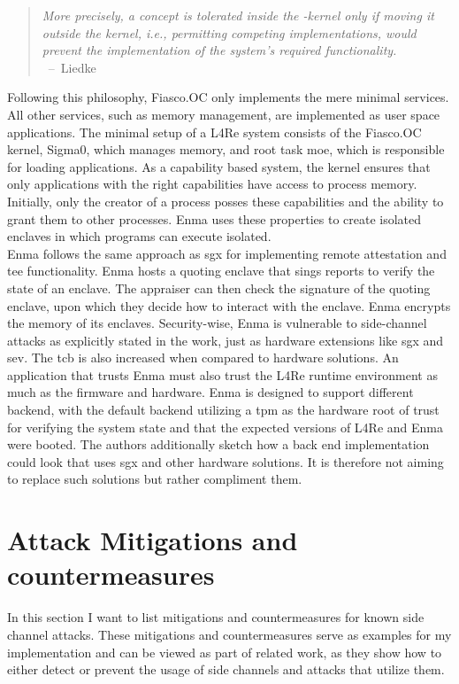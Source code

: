 \begin{quote}
  \textit{ More precisely, a concept is tolerated inside the \mu-kernel only
    if moving it outside the kernel, i.e., permitting competing
    implementations, would prevent the implementation of the system's
    required functionality. \\
  } \mbox{ -- Liedke\cite{liedtke1995micro}}
\end{quote}

Following this philosophy, Fiasco.OC only implements the mere minimal services.
All other services, such as memory management, are implemented as user space
applications. The minimal setup of a L4Re system consists of the Fiasco.OC
kernel, Sigma0, which manages memory, and root task moe, which is responsible
for loading applications. As a capability based system, the kernel ensures that
only applications with the right capabilities have access to process memory.
Initially, only the creator of a process posses these capabilities and the
ability to grant them to other processes. Enma uses these properties to create
isolated enclaves in which programs can execute isolated.\\

Enma follows the same approach as \gls{sgx} for implementing remote attestation
and \gls{tee} functionality. Enma hosts a quoting enclave that sings reports to
verify the state of an enclave. The appraiser can then check the signature of
the quoting enclave, upon which they decide how to interact with the enclave.
Enma encrypts the memory of its enclaves. Security-wise, Enma is vulnerable to
side-channel attacks as explicitly stated in the work, just as hardware
extensions like \gls{sgx} and \gls{sev}. The \gls{tcb} is also increased when
compared to hardware solutions. An application that trusts Enma must also trust
the L4Re runtime environment as much as the firmware and hardware. Enma is
designed to support different backend, with the default backend utilizing a
\gls{tpm} as the hardware root of trust for verifying the system state and that
the expected versions of L4Re and Enma were booted. The authors additionally
sketch how a back end implementation could look that uses \gls{sgx} and other
hardware solutions. It is therefore not aiming to replace such solutions but
rather compliment them.

\section{Attack Mitigations and countermeasures}
\label{sec:20:mitigations}
In this section I want to list mitigations and countermeasures for known
side channel attacks. These mitigations and countermeasures serve as examples
for my implementation and can be viewed as part of related work, as they show
how to either detect or prevent the usage of side channels and attacks that
utilize them.

